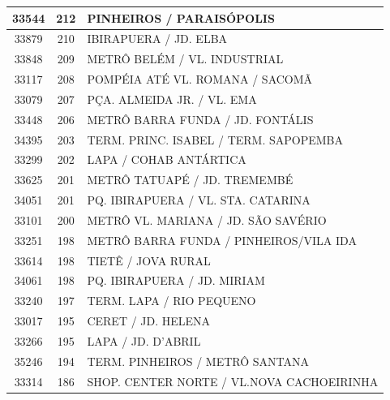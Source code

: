 \documentclass[
	12pt,				%
	oneside,			%
	a4paper,			%
	english,			%
	brazil				%
	]{abntex2ppgsi}
\begin{document}
\begin{apendicesenv}
\begin{longtable}{c|c|p{7cm}}
    33544 & 212   & PINHEIROS / PARAISÓPOLIS \\
\hline

    33879 & 210   & IBIRAPUERA / JD. ELBA \\
\hline

    33848 & 209   & METRÔ BELÉM / VL. INDUSTRIAL \\
\hline

    33117 & 208   & POMPÉIA ATÉ VL. ROMANA / SACOMÃ \\
\hline

    33079 & 207   & PÇA. ALMEIDA JR. / VL. EMA \\
\hline

    33448 & 206   & METRÔ BARRA FUNDA / JD. FONTÁLIS \\
\hline

    34395 & 203   & TERM. PRINC. ISABEL / TERM. SAPOPEMBA \\
\hline

    33299 & 202   & LAPA / COHAB ANTÁRTICA \\
\hline

    33625 & 201   & METRÔ TATUAPÉ / JD. TREMEMBÉ \\
\hline

    34051 & 201   & PQ. IBIRAPUERA / VL. STA. CATARINA \\
\hline

    33101 & 200   & METRÔ VL. MARIANA / JD. SÃO SAVÉRIO \\
\hline

    33251 & 198   & METRÔ BARRA FUNDA / PINHEIROS/VILA IDA  \\
\hline

    33614 & 198   & TIETÊ / JOVA RURAL \\
\hline

    34061 & 198   & PQ. IBIRAPUERA / JD. MIRIAM \\
\hline

    33240 & 197   & TERM. LAPA / RIO PEQUENO \\
\hline

    33017 & 195   & CERET / JD. HELENA \\
\hline

    33266 & 195   & LAPA / JD. D'ABRIL \\
\hline

    35246 & 194   & TERM. PINHEIROS / METRÔ SANTANA \\
\hline

    33314 & 186   & SHOP. CENTER NORTE / VL.NOVA CACHOEIRINHA \\
\hline


\end{longtable}
\end{apendicesenv}
\end{document}
